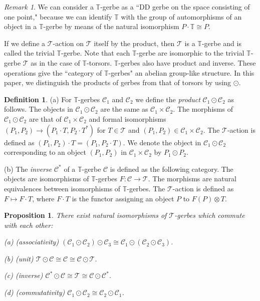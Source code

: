 \documentclass[a4paper,a4paper]{article}
\newtheorem{prop}[thm]{Proposition}
\theoremstyle{definition}
\newtheorem{dfn}[thm]{Definition}
\theoremstyle{remark}
\newtheorem*{rem}{Remark}
\newcommand{\T}{\mathbb{T}}
\newcommand{\sC}{\mathcal{C}}
\newcommand{\sT}{\mathcal{T}}
\begin{document}
\begin{rem}
We can consider a $\T$-gerbe as a ``DD gerbe \cite{Br1,Br2} on the space consisting of one point," because we can identify $\T$ with the group of automorphisms of an object in a $\T$-gerbe by means of the natural isomorphism $P \cdot \T \cong P$.
\end{rem}

If we define a $\sT$-action on $\sT$ itself by the product, then $\sT$ is a $\T$-gerbe and is called the trivial $\T$-gerbe. Note that each $\T$-gerbe are isomorphic to the trivial $\T$-gerbe $\sT$ as in the case of $\T$-torsors. $\T$-gerbes also have product and inverse. These operations give the ``category of $\T$-gerbes" an abelian group-like structure. In this paper, we distinguish the products of gerbes from that of torsors by using $\odot$.

\begin{dfn}
(a) For $\T$-gerbes $\sC_1$ and $\sC_2$ we define the \textit{product} $\sC_1 \odot \sC_2$ as follows. The objects in $\sC_1 \odot \sC_2$ are the same as $\sC_1 \times \sC_2$. The morphisms of $\sC_1 \odot \sC_2$ are that of $\sC_1 \times \sC_2$ and formal isomorphisms $(P_1, P_2) \to (P_1 \cdot T, P_2 \cdot T^*)$ for $T \in \sT$ and $(P_1, P_2) \in \sC_1 \times \sC_2$. The $\sT$-action is defined as $(P_1, P_2) \cdot T = (P_1, P_2 \cdot T)$. We denote the object in $\sC_1 \odot \sC_2$ corresponding to an object $(P_1, P_2)$ in $\sC_1 \times \sC_2$ by $P_1 \odot P_2$. 

(b) The \textit{inverse} $\sC^*$ of a $\T$-gerbe $\sC$ is defined as the following category. The objects are isomorphisms of $\T$-gerbes $F : \sC \to \sT$. The morphisms are natural equivalences between isomorphisms of $\T$-gerbes. The $\sT$-action is defined as $F \mapsto F \cdot T$, where $F \cdot T$ is the functor assigning an object $P$ to $F(P) \otimes T$.
\end{dfn}

\begin{prop}
There exist natural isomorphisms of $\sT$-gerbes which commute with each other: 

(a) (associativity) $(\sC_1 \odot \sC_2) \odot \sC_3 \cong \sC_1 \odot (\sC_2 \odot \sC_3)$.

(b) (unit) $\sT \odot \sC \cong \sC \cong \sC \odot \sT$.

(c) (inverse) $\sC^* \odot \sC \cong \sT \cong \sC \odot \sC^*$.

(d) (commutativity) $\sC_1 \odot \sC_2 \cong \sC_2 \odot \sC_1$.
\end{prop}
\end{document}
